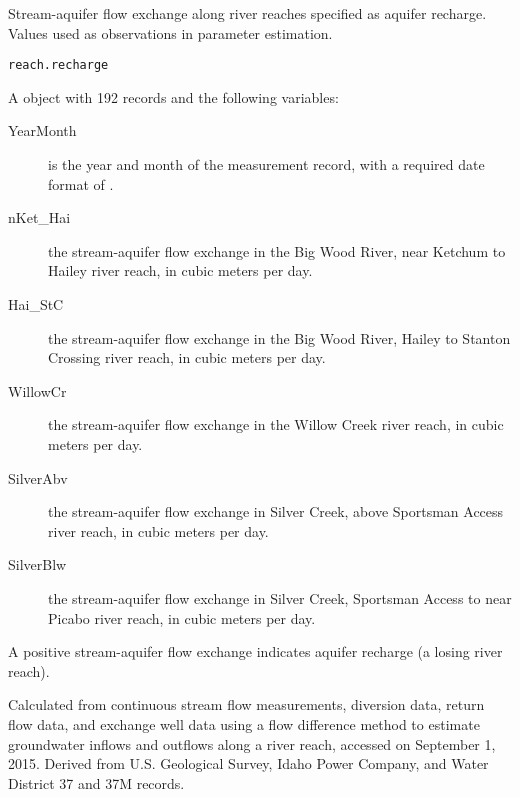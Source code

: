 \documentclass[a4paper]{book}
\begin{document}
%
\begin{Description}\relax
Stream-aquifer flow exchange along river reaches specified as aquifer recharge.
Values used as observations in parameter estimation.
\end{Description}
%
\begin{Usage}
\begin{verbatim}
reach.recharge
\end{verbatim}
\end{Usage}
%
\begin{Format}
A  object with 192 records and the following variables:
\begin{description}

\item[YearMonth] is the year and month of the measurement record, with a required date format of .
\item[nKet\_Hai] the stream-aquifer flow exchange in the Big Wood River, near Ketchum to Hailey river reach, in cubic meters per day.
\item[Hai\_StC] the stream-aquifer flow exchange in the Big Wood River, Hailey to Stanton Crossing river reach, in cubic meters per day.
\item[WillowCr] the stream-aquifer flow exchange in the Willow Creek river reach, in cubic meters per day.
\item[SilverAbv] the stream-aquifer flow exchange in Silver Creek, above Sportsman Access river reach, in cubic meters per day.
\item[SilverBlw] the stream-aquifer flow exchange in Silver Creek, Sportsman Access to near Picabo river reach, in cubic meters per day.

\end{description}

\end{Format}
%
\begin{Details}\relax
A positive stream-aquifer flow exchange indicates aquifer recharge (a losing river reach).
\end{Details}
%
\begin{Source}\relax
Calculated from continuous stream flow measurements, diversion data, return flow data, and exchange well data
using a flow difference method to estimate groundwater inflows and outflows along a river reach, accessed on September 1, 2015.
Derived from U.S. Geological Survey, Idaho Power Company, and Water District 37 and 37M records.
\end{Source}
\end{document}
